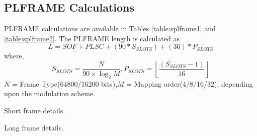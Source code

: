 \documentclass[journal,12pt,twocolumn]{IEEEtran}
\begin{document}
%
\subsection{PLFRAME Calculations}
PLFRAME calculations are available in Tables \ref{table:splframe1} and \ref{table:splframe2}. 
The PLFRAME length is calculated as
%
\begin{equation}
\label{eq:plength}
L= {SOF}+PLSC+(90*S_{SLOTS})+(36)*P_{SLOTS}
\end{equation}
where,
\begin{equation}
\nonumber
S_{SLOTS}=\frac{N}{90\times\log_2M},P_{SLOTS}=\left\lfloor \frac{(S_{SLOTS}-1)}{16} \right\rfloor
\end{equation}
$N$ = Frame Type(64800/16200 bits),$M$ = Mapping order(4/8/16/32), depending upon the modulation scheme. 


%
\begin{table}[!ht]
\begin{center}
{\tiny

}
\end{center}
\caption{Short frame details.}
\label{table:splframe1}
\end{table}
%
\begin{table}[!ht]
\begin{center}
{\tiny

}
\end{center}
\caption{Long frame details.}
\label{table:splframe2}
\end{table}
\end{document}
